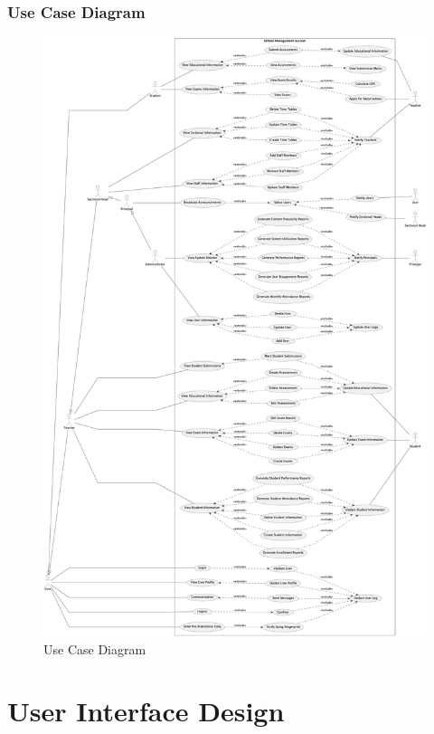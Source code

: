\documentclass[12pt,a4paper]{report}
\begin{document}
\subsection{Use Case Diagram}
\begin{figure}[htbp]
    \centering
    \includegraphics[width=1\textwidth]{use-case-diagram.png}
    \caption{Use Case Diagram}
    \label{fig:use-case-diagram}
\end{figure}

\chapter{User Interface Design}
\end{document}
